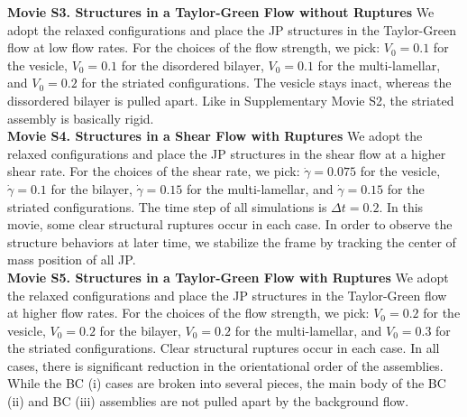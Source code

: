 \noindent
{\bf Movie S3. Structures in a Taylor-Green Flow without Ruptures} 
We adopt the relaxed configurations and place the JP structures in the
Taylor-Green flow at low flow rates. For the choices of the flow
strength, we pick: $V_0 = 0.1$ for the vesicle, $V_0 = 0.1$ for the
disordered bilayer, $V_0 = 0.1$ for the multi-lamellar, and $V_0 = 0.2$
for the striated configurations. The vesicle stays inact, whereas the
dissordered bilayer is pulled apart. Like in Supplementary Movie S2, the
striated assembly is basically rigid. \\


\noindent
{\bf Movie S4. Structures in a Shear Flow with Ruptures} 
We adopt the relaxed configurations and place the JP structures in the
shear flow at a higher shear rate. For the choices of the shear rate, we
pick: $\dot\gamma = 0.075$ for the vesicle, $\dot\gamma = 0.1$ for the
bilayer, $\dot\gamma = 0.15$ for the multi-lamellar, and $\dot\gamma =
0.15$ for the striated configurations. The time step of all simulations
is $\Delta t=0.2$. In this movie, some clear structural ruptures occur
in each case. In order to observe the structure behaviors at later time,
we stabilize the frame by tracking the center of mass position of all
JP. \\


\noindent
{\bf Movie S5. Structures in a Taylor-Green Flow with Ruptures} 
We adopt the relaxed configurations and place the JP structures in the
Taylor-Green flow at higher flow rates. For the choices of the flow
strength, we pick: $V_0 = 0.2$ for the vesicle, $V_0 = 0.2$ for the
bilayer, $V_0 = 0.2$ for the multi-lamellar, and $V_0 = 0.3$ for the
striated configurations. Clear structural ruptures occur in each case.
In all cases, there is significant reduction in the orientational order
of the assemblies. While the BC (i) cases are broken into several
pieces, the main body of the BC (ii) and BC (iii) assemblies are not
pulled apart by the background flow. 

